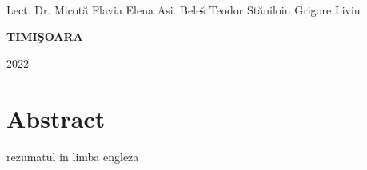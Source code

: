 \documentclass[12pt,a4paper]{report}
\newtheorem{thm}{Teorema}[section]
\newtheorem{cor}[thm]{Corolarul}
\newtheorem{prop}[thm]{Propozi\c tia}
\theoremstyle{definition}
\newtheorem{defn}{Defini\c tia}[section]
\theoremstyle{remark}
\newtheorem{exmp}{Exemplul}[section]
\begin{document}
{\large{}\\

\noindent Lect. Dr. Micot\u a Flavia Elena \newline Asi. Bele\u s Teodor  \hfill St\u aniloiu Grigore Liviu}

\vfill
\begin{center}
{\bf TIMI\c SOARA

2022}
\end{center}
\newpage
\normalsize{}
\section*{Abstract}
rezumatul in limba engleza





% 
% 

\tableofcontents

% 


\end{document}

